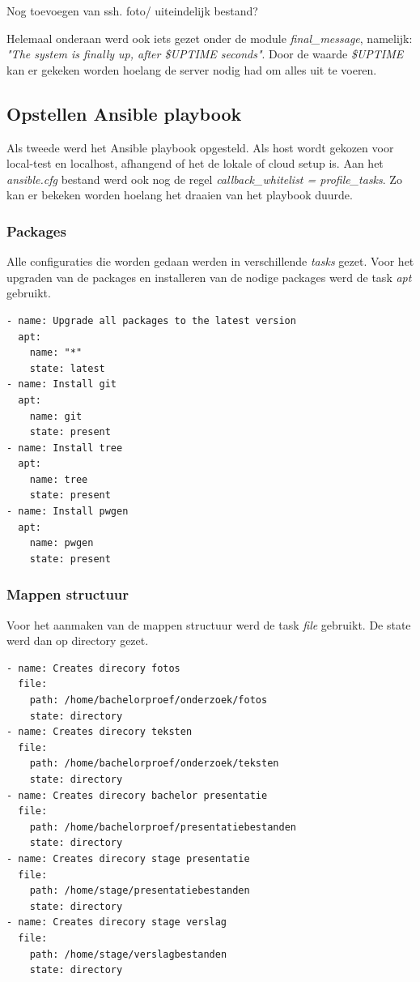Nog toevoegen van ssh. foto/ uiteindelijk bestand?

Helemaal onderaan werd ook iets gezet onder de module \textit{final\_message}, namelijk: \textit{"The system is finally up, after \$UPTIME seconds"}. Door de waarde \textit{\$UPTIME} kan er gekeken worden hoelang de server nodig had om alles uit te voeren.

\subsection{Opstellen Ansible playbook}
Als tweede werd het Ansible playbook opgesteld. Als host wordt gekozen voor local-test en localhost, afhangend of het de lokale of cloud setup is. Aan het \textit{ansible.cfg} bestand werd ook nog de regel \textit{callback\_whitelist = profile\_tasks}. Zo kan er bekeken worden hoelang het draaien van het playbook duurde.

\subsubsection{Packages}
Alle configuraties die worden gedaan werden in verschillende \textit{tasks} gezet. Voor het upgraden van de packages en installeren van de nodige packages werd de task \textit{apt} gebruikt.
\begin{lstlisting}
- name: Upgrade all packages to the latest version
  apt:
    name: "*"
    state: latest
- name: Install git
  apt:
    name: git
    state: present
- name: Install tree
  apt:
    name: tree
    state: present
- name: Install pwgen
  apt:
    name: pwgen
    state: present
\end{lstlisting}
\subsubsection{Mappen structuur}
Voor het aanmaken van de mappen structuur werd de task \textit{file} gebruikt. De state werd dan op directory gezet.
\begin{lstlisting}
- name: Creates direcory fotos
  file:
    path: /home/bachelorproef/onderzoek/fotos
    state: directory
- name: Creates direcory teksten
  file:
    path: /home/bachelorproef/onderzoek/teksten
    state: directory
- name: Creates direcory bachelor presentatie
  file:
    path: /home/bachelorproef/presentatiebestanden
    state: directory
- name: Creates direcory stage presentatie
  file:
    path: /home/stage/presentatiebestanden
    state: directory
- name: Creates direcory stage verslag
  file:
    path: /home/stage/verslagbestanden
    state: directory
\end{lstlisting}
